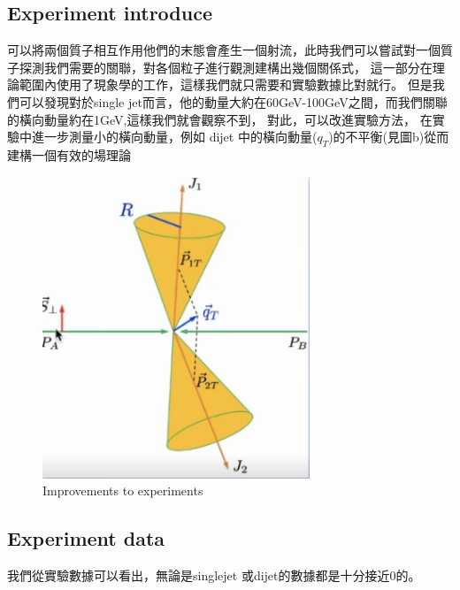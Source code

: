 \documentclass[12pt, a4paper, oneside]{ctexart}
\begin{document}
\begin{spacing}{2.0}
\subsection{Experiment introduce}
可以將兩個質子相互作用他們的末態會產生一個射流，此時我們可以嘗試對一個質子探測我們需要的關聯，對各個粒子進行觀測建構出幾個關係式，
這一部分在理論範圍內使用了現象學的工作，這樣我們就只需要和實驗數據比對就行。
但是我們可以發現對於single jet而言，他的動量大約在60GeV-100GeV之間，而我們關聯的橫向動量約在1GeV,這樣我們就會觀察不到，
對此，可以改進實驗方法，
在實驗中進一步測量小的橫向動量，例如 dijet 中的橫向動量($q_T$)的不平衡(見圖b)從而建構一個有效的場理論
\begin{figure}
    \centering
    \includegraphics[width=8cm]{delta.jpg}
    \caption{Improvements to experiments}    
\end{figure}

\subsection{Experiment data}
我們從實驗數據可以看出，無論是singlejet 或dijet的數據都是十分接近0的。


\end{spacing}
\end{document}
